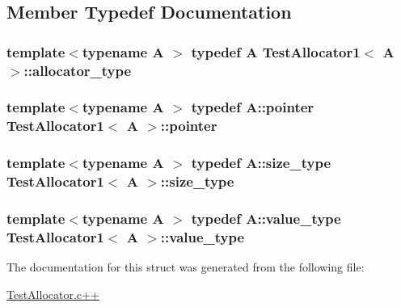\subsection{Member Typedef Documentation}
\hypertarget{structTestAllocator1_af833c587251c56fda9cc1169d40545d5}{
\subsubsection[{allocator\-\_\-type}]{\setlength{\rightskip}{0pt plus 5cm}template$<$typename A $>$ typedef A {\bf Test\-Allocator1}$<$ A $>$\-::{\bf allocator\-\_\-type}}}\label{structTestAllocator1_af833c587251c56fda9cc1169d40545d5}
\hypertarget{structTestAllocator1_a2d4b518664da974c318e96f1d5fe8cf5}{
\subsubsection[{pointer}]{\setlength{\rightskip}{0pt plus 5cm}template$<$typename A $>$ typedef A\-::pointer {\bf Test\-Allocator1}$<$ A $>$\-::{\bf pointer}}}\label{structTestAllocator1_a2d4b518664da974c318e96f1d5fe8cf5}
\hypertarget{structTestAllocator1_aa8c669c72a5405cad2024cb1f2d0213d}{
\subsubsection[{size\-\_\-type}]{\setlength{\rightskip}{0pt plus 5cm}template$<$typename A $>$ typedef A\-::size\-\_\-type {\bf Test\-Allocator1}$<$ A $>$\-::{\bf size\-\_\-type}}}\label{structTestAllocator1_aa8c669c72a5405cad2024cb1f2d0213d}
\hypertarget{structTestAllocator1_a92fce0c8423cac5757d6b1d253d646d5}{
\subsubsection[{value\-\_\-type}]{\setlength{\rightskip}{0pt plus 5cm}template$<$typename A $>$ typedef A\-::value\-\_\-type {\bf Test\-Allocator1}$<$ A $>$\-::{\bf value\-\_\-type}}}\label{structTestAllocator1_a92fce0c8423cac5757d6b1d253d646d5}


The documentation for this struct was generated from the following file\-:\begin{DoxyCompactItemize}
\item 
\hyperlink{TestAllocator_8c_09_09}{Test\-Allocator.\-c++}\end{DoxyCompactItemize}
